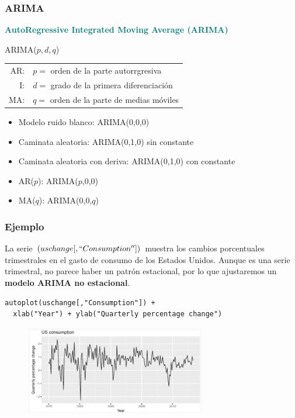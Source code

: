 \documentclass[10pt]{beamer}
\begin{document}
\begin{frame}[fragile]
\frametitle{ARIMA}


\textcolor{teal}{\textbf{AutoRegressive Integrated Moving Average (ARIMA)}}

\begin{block}{ARIMA($p, d, q$)}
\begin{tabular}{rl}
AR:& $p =$  orden de la parte autorrgresiva\\
I: & $d =$  grado de la primera diferenciación\\
MA:& $q =$  orden de la parte de medias móviles
\end{tabular}
\end{block}

\vspace{4mm}


\begin{itemize}
\item Modelo ruido blanco:  ARIMA(0,0,0)
\item Caminata aleatoria:  ARIMA(0,1,0) sin constante
\item Caminata aleatoria con deriva:  ARIMA(0,1,0) con constante
\item AR($p$): ARIMA($p$,0,0)
\item MA($q$): ARIMA(0,0,$q$)
\end{itemize}

\end{frame}





\begin{frame}[fragile]
\frametitle{Ejemplo}

La serie $(uschange[,``Consumption''])$ muestra los cambios porcentuales trimestrales en el gasto de consumo de los Estados Unidos. Aunque es una serie trimestral, no parece haber un patrón estacional, por lo que ajustaremos un \textbf{modelo ARIMA no estacional}.



\lstset{language=r,label= ,caption= ,captionpos=b,numbers=none}
\begin{lstlisting}
autoplot(uschange[,"Consumption"]) +
  xlab("Year") + ylab("Quarterly percentage change")
\end{lstlisting}

\pause


\begin{figure}
\begin{center}
    \includegraphics[width=0.7\textwidth]{Imagen11.JPG}
\end{center}
\end{figure}


\end{frame}
\end{document}
